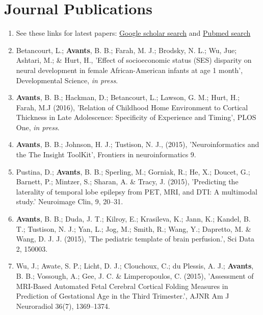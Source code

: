 \documentclass[11pt]{moderncv} %
\begin{document}
\section{Journal Publications} %
\begin{enumerate}
\item See these links for latest papers: \href{https://scholar.google.com/citations?hl=en&user=t4kkowgAAAAJ&view_op=list_works&sortby=pubdate}{Google scholar search} and \href{http://www.ncbi.nlm.nih.gov/pubmed?term=(\%22Avants\%20B\%22)\%20}{Pubmed  search}

\item Betancourt, L.; \textbf{Avants}, B. B.; Farah, M. J.; Brodsky, N. L.; Wu, Jue;  Ashtari, M.; \& Hurt, H., 'Effect of socioeconomic status (SES) disparity on neural development in female African-American infants at age 1 month', Developmental Science, \emph{in press}.

\item \textbf{Avants}, B. B.; Hackman, D.; Betancourt, L.; Lawson, G. M.; Hurt, H.; Farah, M.J (2016), 'Relation of Childhood Home Environment to Cortical Thickness in Late Adolescence: Specificity of Experience and Timing', PLOS One, \emph{in press}.

\item  \textbf{Avants}, B. B.; Johnson, H. J.; Tustison, N. J., (2015), 'Neuroinformatics and the The Insight ToolKit', Frontiers in neuroinformatics 9.

\item Pustina, D.; \textbf{Avants}, B. B.; Sperling, M.; Gorniak, R.; He, X.; Doucet, G.; Barnett, P.; Mintzer, S.; Sharan, A. \& Tracy, J. (2015), 'Predicting the laterality of temporal lobe epilepsy from PET, MRI, and DTI: A multimodal study.' Neuroimage Clin, 9, 20--31.

\item \textbf{Avants}, B. B.; Duda, J. T.; Kilroy, E.; Krasileva, K.; Jann, K.; Kandel, B. T.; Tustison, N. J.; Yan, L.; Jog, M.; Smith, R.; Wang, Y.; Dapretto, M. \& Wang, D. J. J. (2015), 'The pediatric template of brain perfusion.', Sci Data 2, 150003.

\item Wu, J.; Awate, S. P.; Licht, D. J.; Clouchoux, C.; du Plessis, A. J.; \textbf{Avants}, B. B.; Vossough, A.; Gee, J. C. \& Limperopoulos, C. (2015), 'Assessment of MRI-Based Automated Fetal Cerebral Cortical Folding Measures in Prediction of Gestational Age in the Third Trimester.', AJNR Am J Neuroradiol 36(7), 1369--1374.


\end{enumerate}
\end{document}
